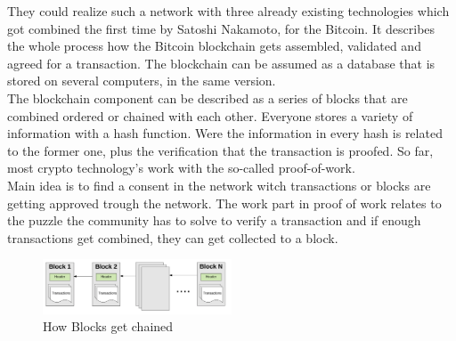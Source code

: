 They could realize such a network with three already existing technologies which got combined the first time by Satoshi Nakamoto, for the Bitcoin. It describes the whole process how the Bitcoin blockchain gets assembled, validated and agreed for a transaction. The blockchain can be assumed as a database that is stored on several computers, in the same version. \cite{grishchenko2018semantic} 
\\
The blockchain component can be described as a series of blocks that are combined ordered or chained with each other. Everyone stores a variety of information with a hash function. Were the information in every hash is related to the former one, plus the verification that the transaction is proofed. So far, most crypto technology’s work with the so-called proof-of-work. \cite{Ray 2018}
\\
Main idea is to find a consent in the network witch transactions or blocks are getting approved trough the network. The work part in proof of work relates to the puzzle the community has to solve to verify a transaction and if enough transactions get combined, they can get collected to a block.

\begin{figure}[ht]
\caption{How Blocks get chained} 
\includegraphics[width=0.5\textwidth]{blockchain}
\end{figure}


